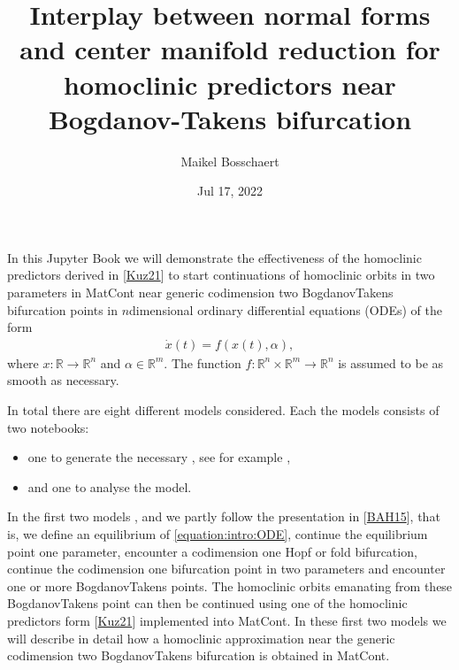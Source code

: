 \documentclass[letterpaper,10pt,english]{jupyterBook}
\title{Interplay between normal forms and center manifold reduction for homoclinic predictors near Bogdanov-Takens bifurcation}
\date{Jul 17, 2022}
\author{Maikel Bosschaert}
\begin{document}
\pagestyle{empty}
\sphinxmaketitle
\pagestyle{plain}
\sphinxtableofcontents
\pagestyle{normal}
\label{\detokenize{intro::doc}}


\sphinxAtStartPar
In this Jupyter Book we will demonstrate the effectiveness of the homoclinic
predictors derived in {[}\hyperlink{cite.references:id3}{Kuz21}{]} to start continuations of
homoclinic orbits in two parameters in MatCont near generic codimension two
Bogdanov\sphinxhyphen{}Takens bifurcation points in \(n\)\sphinxhyphen{}dimensional ordinary differential
equations (ODEs) of the form
\begin{equation}\label{equation:intro:ODE}
\begin{split}\dot x(t) = f(x(t), \alpha),\end{split}
\end{equation}
\sphinxAtStartPar
where \(x: \mathbb R \to \mathbb R^n\) and \(\alpha \in \mathbb R^m\). The
function \(f : \mathbb R^n \times \mathbb R^m \to \mathbb R^n\) is assumed to
be as smooth as necessary.

\sphinxAtStartPar
In total there are eight different models considered. Each the models consists
of two notebooks:
\begin{itemize}
\item {} 
\sphinxAtStartPar
one to generate the necessary , see for example
{\hyperref[\detokenize{Morris-LecarGenSym::doc}]{}},

\item {} 
\sphinxAtStartPar
and one  to analyse the model.

\end{itemize}

\sphinxAtStartPar
In the first two models {\hyperref[\detokenize{Morris-Lecar::doc}]{}},  and {\hyperref[\detokenize{CO-oxidation::doc}]{}}
we partly follow the presentation in {[}\hyperlink{cite.references:id5}{BAH15}{]}, that is, we define an
equilibrium of \eqref{equation:intro:ODE}, continue the equilibrium point one parameter, encounter
a codimension one Hopf or fold bifurcation, continue the codimension one
bifurcation point in two parameters and encounter one or more Bogdanov\sphinxhyphen{}Takens
points. The homoclinic orbits emanating from these Bogdanov\sphinxhyphen{}Takens point can
then be continued using one of the homoclinic predictors form
{[}\hyperlink{cite.references:id3}{Kuz21}{]} implemented into MatCont. In these first two models we
will describe in detail how a homoclinic approximation near the generic
codimension two Bogdanov\sphinxhyphen{}Takens bifurcation is obtained in MatCont.
\end{document}
